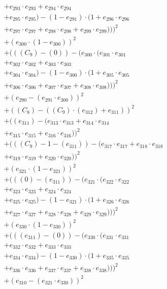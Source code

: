 \documentclass[10pt, a4paper]{article}
\begin{document}
\begin{align*}
& + e_{293} \cdot e_{293} + e_{294} \cdot e_{294} \\
& + e_{295} \cdot e_{295}) - (1 - e_{291}) \cdot (1 + e_{296} \cdot e_{296} \\
& + e_{297} \cdot e_{297} + e_{298} \cdot e_{298} + e_{299} \cdot e_{299})))^{2} \\
& + (e_{300} \cdot (1 - e_{300}))^{2} \\
& + (((C_{9}) - (0)) - (e_{300} \cdot (e_{301} \cdot e_{301} \\
& + e_{302} \cdot e_{302} + e_{303} \cdot e_{303} \\
& + e_{304} \cdot e_{304}) - (1 - e_{300}) \cdot (1 + e_{305} \cdot e_{305} \\
& + e_{306} \cdot e_{306} + e_{307} \cdot e_{307} + e_{308} \cdot e_{308})))^{2} \\
& + (e_{290} - (e_{291} \cdot e_{300}))^{2} \\
& + ((C_{8}) - ((C_{9})  \cdot  (e_{312}) + e_{311}))^{2} \\
& + ((e_{311}) - (e_{313} \cdot e_{313} + e_{314} \cdot e_{314} \\
& + e_{315} \cdot e_{315} + e_{316} \cdot e_{316}))^{2} \\
& + (((C_{9}) - 1 - (e_{311})) - (e_{317} \cdot e_{317} + e_{318} \cdot e_{318} \\
& + e_{319} \cdot e_{319} + e_{320} \cdot e_{320}))^{2} \\
& + (e_{321} \cdot (1 - e_{321}))^{2} \\
& + (((0) - (e_{311})) - (e_{321} \cdot (e_{322} \cdot e_{322} \\
& + e_{323} \cdot e_{323} + e_{324} \cdot e_{324} \\
& + e_{325} \cdot e_{325}) - (1 - e_{321}) \cdot (1 + e_{326} \cdot e_{326} \\
& + e_{327} \cdot e_{327} + e_{328} \cdot e_{328} + e_{329} \cdot e_{329})))^{2} \\
& + (e_{330} \cdot (1 - e_{330}))^{2} \\
& + (((e_{311}) - (0)) - (e_{330} \cdot (e_{331} \cdot e_{331} \\
& + e_{332} \cdot e_{332} + e_{333} \cdot e_{333} \\
& + e_{334} \cdot e_{334}) - (1 - e_{330}) \cdot (1 + e_{335} \cdot e_{335} \\
& + e_{336} \cdot e_{336} + e_{337} \cdot e_{337} + e_{338} \cdot e_{338})))^{2} \\
& + (e_{310} - (e_{321} \cdot e_{330}))^{2} \\

\end{align*}
\end{document}
